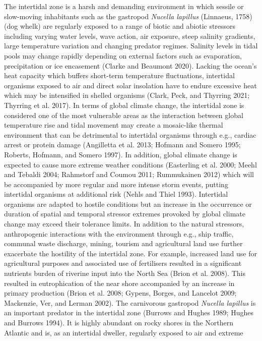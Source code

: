 \documentclass[smallextended]{svjour3}       %
\begin{document}
The intertidal zone is a harsh and demanding environment in which
sessile or slow-moving inhabitants such as the gastropod \emph{Nucella
lapillus} (Linnaeus, 1758) (dog whelk) are regularly exposed to a range
of biotic and abiotic stressors including varying water levels, wave
action, air exposure, steep salinity gradients, large temperature
variation and changing predator regimes. Salinity levels in tidal pools
may change rapidly depending on external factors such as evaporation,
precipitation or ice encasement (Clarke and Beaumont 2020). Lacking the
ocean's heat capacity which buffers short-term temperature fluctuations,
intertidal organisms exposed to air and direct solar insolation have to
endure excessive heat which may be intensified in shelled organisms
(Clark, Peck, and Thyrring 2021; Thyrring et al. 2017). In terms of
global climate change, the intertidal zone is considered one of the most
vulnerable areas as the interaction between global temperature rise and
tidal movement may create a mosaic-like thermal environment that can be
detrimental to intertidal organisms through e.g., cardiac arrest or
protein damage (Angilletta et al. 2013; Hofmann and Somero 1995;
Roberts, Hofmann, and Somero 1997). In addition, global climate change
is expected to cause more extreme weather conditions (Easterling et al.
2000; Meehl and Tebaldi 2004; Rahmstorf and Coumou 2011; Rummukainen
2012) which will be accompanied by more regular and more intense storm
events, putting intertidal organisms at additional risk (Nehls and Thiel
1993). Intertidal organisms are adapted to hostile conditions but an
increase in the occurrence or duration of spatial and temporal stressor
extremes provoked by global climate change may exceed their tolerance
limits. In addition to the natural stressors, anthropogenic interactions
with the environment through e.g., ship traffic, communal waste
discharge, mining, tourism and agricultural land use further exacerbate
the hostility of the intertidal zone. For example, increased land use
for agricultural purposes and associated use of fertilisers resulted in
a significant nutrients burden of riverine input into the North Sea
(Brion et al. 2008). This resulted in eutrophication of the near shore
accompanied by an increase in primary production (Brion et al. 2008;
Gypens, Borges, and Lancelot 2009; Mackenzie, Ver, and Lerman 2002). The
carnivorous gastropod \emph{Nucella lapillus} is an important predator
in the intertidal zone (Burrows and Hughes 1989; Hughes and Burrows
1994). It is highly abundant on rocky shores in the Northern Atlantic
and is, as an intertidal dweller, regularly exposed to air and extreme
\end{document}
